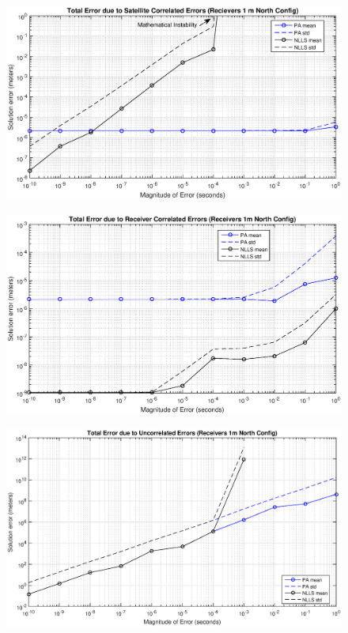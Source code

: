 \begin{figure}
\centering
\caption{}
\label{fig:Error_satellite}
\includegraphics[width=1\linewidth]{ChapterExperiments/Figures/ControlledError/satellite}
\end{figure}

\begin{figure}
\centering
\caption{}
\label{fig:Receivers}
\includegraphics[width=1\linewidth]{ChapterExperiments/Figures/ControlledError/Receivers}
\end{figure}
\begin{figure}
\centering
\caption{}
\label{fig:Uncorellated}
\includegraphics[width=1\linewidth]{ChapterExperiments/Figures/ControlledError/Uncorellated}
\end{figure}


